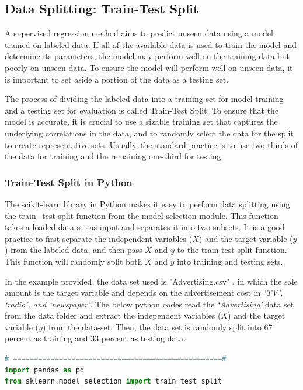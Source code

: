 {\newpage
\subsection{Data Splitting: Train-Test Split}
A supervised regression method aims to predict unseen data using a model trained on labeled data. If all of the available data is used to train the model and determine its parameters, the model may perform well on the training data but poorly on unseen data. To ensure the model will perform well on unseen data, it is important to set aside a portion of the data as a testing set.

The process of dividing the labeled data into a training set for model training and a testing set for evaluation is called Train-Test Split. To ensure that the model is accurate, it is crucial to use a sizable training set that captures the underlying correlations in the data, and to randomly select the data for the split to create representative sets. Usually, the standard practice is to use two-thirds of the data for training and the remaining one-third for testing.

\subsubsection{\textbf{Train-Test Split in Python}}
The scikit-learn library in Python makes it easy to perform data splitting using the train\_test$\_$split function from the model$\_$selection module. This function takes a loaded data-set as input and separates it into two subsets. It is a good practice to first separate the independent variables ($X$) and the target variable ($y$) from the labeled data, and then pass $X$ and $y$ to the train$\_$test$\_$split function. This function will randomly split both $X$ and $y$ into training and testing sets.

In the example provided, the data set used is "Advertising.csv" \cite{web:adData}, in which the sale amount is the target variable and depends on the advertisement cost in  \emph{`TV', `radio', and `newspaper'}. The below python codes read the \emph{`Advertising'} data set from the data folder and extract the independent variables ($X$) and the target variable ($y$) from the data-set. Then, the data set is randomly split into 67 percent as training and 33 percent as testing data.

\begin{lstlisting}[language=Python]
# ==================================================#
import pandas as pd
from sklearn.model_selection import train_test_split


\end{lstlisting}}
